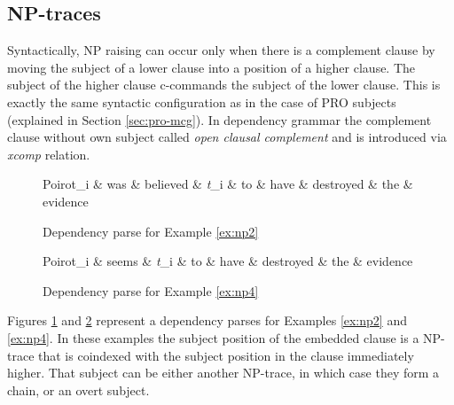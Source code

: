 \subsection{NP-traces}
\label{sec:np-traces}
Syntactically, NP raising can occur only when there is a complement clause by moving the subject of a lower clause into a position of a higher clause. The subject of the higher clause c-commands the subject of the lower clause. This is exactly the same syntactic configuration as in the case of PRO subjects (explained in Section \ref{sec:pro-mcg}). In dependency grammar the complement clause without own subject called \textit{open clausal complement} and is introduced via \textit{xcomp} relation.

\begin{figure}[!ht]
	\centering
	\begin{dependency}
		\begin{deptext}[]
			Poirot_i \& was \& believed \& \textit{t}_i \& to \& have \& destroyed \& the \& evidence \\
		\end{deptext}
	\end{dependency}
	\caption{Dependency parse for Example \ref{ex:np2}}
	\label{fig:np-mcg1}
\end{figure}

\begin{figure}[!ht]
    \centering
    \begin{dependency}
        \begin{deptext}[]
            Poirot_i \& seems \& \textit{t}_i \& to \& have \& destroyed \& the \& evidence \\
        \end{deptext}
    \end{dependency}
    \caption{Dependency parse for Example \ref{ex:np4}}
    \label{fig:np-mcg2} 
\end{figure}

Figures \ref{fig:np-mcg1} and \ref{fig:np-mcg2} represent a dependency parses for Examples \ref{ex:np2} and \ref{ex:np4}. In these examples the subject position of the embedded clause is a NP-trace that is coindexed with the subject position in the  clause immediately higher. That subject can be either another NP-trace, in which case they form a chain, or an overt subject. 

